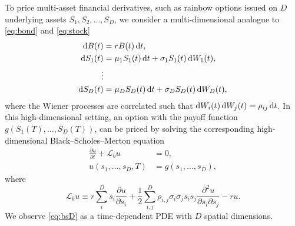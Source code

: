 \documentclass{UUThesisTemplate}
\begin{document}
\par
To price multi-asset financial derivatives, such as rainbow options issued on $D$ underlying assets $S_1,S_2,\ldots,S_D$, we consider a multi-dimensional analogue to \eqref{eq:bond} and \eqref{eq:stock}
\begin{align}
\dif B(t)&=rB(t)\dif t, \nonumber \\
\dif S_1(t)&=\mu_1 S_1(t)\dif t+\sigma_1 S_1(t)\dif W_1(t), \nonumber \\
\vdots \nonumber \\ 
\dif S_D(t)&=\mu_D S_D(t)\dif t+\sigma_D S_D(t)\dif W_D(t), \label{eq:multi}
\end{align}
where the Wiener processes are correlated such that $\dif W_i(t)\dif W_j(t)=\rho_{ij}\dif t$. In this high-dimensional setting, an option with the payoff function $g(S_1(T),\ldots,S_D(T))$, can be priced by solving the corresponding high-dimensional Black--Scholes--Merton equation
\begin{align}
\frac{\partial u}{\partial t}+\mathcal{L}_b u&=0, \nonumber \\
u(s_1,\ldots,s_D,T)&=g(s_1,\ldots,s_D), \label{eq:bsD}
\end{align}
where
\begin{equation}
\label{eqBSop}
\mathcal{L}_b u \equiv r\sum\limits_{i}^{D}s_i\frac{\partial u}{\partial{s_i}}+\frac{1}{2}\sum\limits_{i,j}^{D}\rho_{i,j}\sigma_i\sigma_j s_is_j\frac{\partial^2u}{\partial s_i \partial s_j}-ru.
\end{equation}
We observe \eqref{eq:bsD} as a time-dependent PDE with $D$ spatial dimensions.
\end{document}
